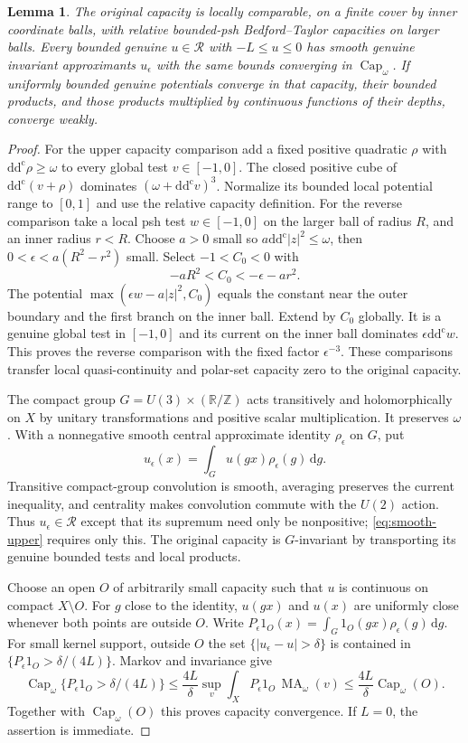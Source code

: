 \documentclass[11pt]{article}
\newtheorem{lemma}[theorem]{Lemma}
\theoremstyle{remark}
\newcommand{\ddc}{\mathrm{d}\mathrm{d}^{\mathrm c}}
\newcommand{\R}{\mathbb R}
\newcommand{\MA}{\operatorname{MA}}
\begin{document}
\begin{lemma}\label{lem:capacity}
The original capacity is locally comparable, on a finite cover by inner
coordinate balls, with relative bounded-psh Bedford--Taylor capacities on
larger balls. Every bounded genuine $u\in\mathcal R$ with $-L\leq u\leq0$
has smooth genuine invariant approximants $u_\epsilon$ with the same
bounds converging in $\operatorname{Cap}_\omega$. If uniformly bounded
genuine potentials converge in that capacity, their bounded products,
and those products multiplied by continuous functions of their depths,
converge weakly.
\end{lemma}
\begin{proof}
For the upper capacity comparison add a fixed positive quadratic $\rho$
with $\ddc\rho\geq\omega$ to every global test $v\in[-1,0]$.
The closed positive cube of $\ddc(v+\rho)$ dominates
$(\omega+\ddc v)^3$. Normalize its bounded local potential range to
$[0,1]$ and use the relative capacity definition.
For the reverse comparison take a local psh test $w\in[-1,0]$ on the
larger ball of radius $R$, and an inner radius $r<R$.
Choose $a>0$ small so $a\ddc|z|^2\leq\omega$, then
$0<\epsilon<a(R^2-r^2)$ small. Select $-1<C_0<0$ with
\[
 -aR^2<C_0<-\epsilon-ar^2.
\]
The potential $\max(\epsilon w-a|z|^2,C_0)$ equals the constant near
the outer boundary and the first branch on the inner ball. Extend by
$C_0$ globally. It is a genuine global test in $[-1,0]$ and its current
on the inner ball dominates $\epsilon\ddc w$. This proves the reverse
comparison with the fixed factor $\epsilon^{-3}$. These comparisons
transfer local quasi-continuity and polar-set capacity zero to the
original capacity.

The compact group $G=U(3)\times(\R/\mathbb Z)$ acts transitively and
holomorphically on $X$ by unitary transformations and positive scalar
multiplication. It preserves $\omega$. With a nonnegative smooth central
approximate identity $\rho_\epsilon$ on $G$, put
\[
 u_\epsilon(x)=\int_Gu(gx)\rho_\epsilon(g)\,\mathrm dg.
\]
Transitive compact-group convolution is smooth, averaging preserves the
current inequality, and centrality makes convolution commute with the
$U(2)$ action. Thus $u_\epsilon\in\mathcal R$ except that its supremum
need only be nonpositive; \eqref{eq:smooth-upper} requires only this.
The original capacity is $G$-invariant by transporting its genuine
bounded tests and local products.

Choose an open $O$ of arbitrarily small capacity such that $u$ is
continuous on compact $X\setminus O$. For $g$ close to the identity,
$u(gx)$ and $u(x)$ are uniformly close whenever both points are outside
$O$. Write $P_\epsilon1_O(x)=\int_G1_O(gx)\rho_\epsilon(g)\,\mathrm dg$.
For small kernel support, outside $O$ the set
$\{|u_\epsilon-u|>\delta\}$ is contained in
$\{P_\epsilon1_O>\delta/(4L)\}$. Markov and invariance give
\[
 \operatorname{Cap}_\omega
    \{P_\epsilon1_O>\delta/(4L)\}
 \leq\frac{4L}{\delta}
       \sup_v\int_XP_\epsilon1_O\,\MA_\omega(v)
 \leq\frac{4L}{\delta}\operatorname{Cap}_\omega(O).
\]
Together with $\operatorname{Cap}_\omega(O)$ this proves capacity
convergence. If $L=0$, the assertion is immediate.


\end{proof}
\end{document}
